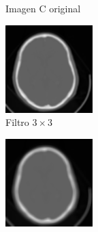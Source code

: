 \documentclass[letterpaper,12pt]{article}
\theoremstyle{plain}
\begin{document}
\begin{figure}[H]
\begin{subfigure}[h]{0.24\linewidth}
            \caption{Imagen C original} 
         \end{subfigure}
         \begin{subfigure}[h]{0.24\linewidth}
            \centering
            \includegraphics[width=\textwidth]{Figuras/ImagenC3x3.png}
            \caption{\centering Filtro $3\times3$} 
         \end{subfigure}
         \begin{subfigure}[h]{0.24\linewidth}
            \centering
            \includegraphics[width=\textwidth]{Figuras/ImagenC5x5.png}

\end{subfigure}
\end{figure}
\end{document}
